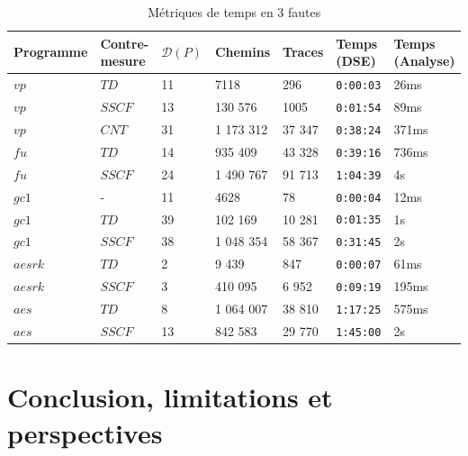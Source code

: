                \begin{table}[htbp]
                \centering
                {\small
                    \setlength\tabcolsep{3pt}
                    \begin{tabular}{ll|lll|ll}
                    Programme & Contre-mesure & $\mathcal{D}(P)$ & Chemins & Traces & Temps (DSE) & Temps (Analyse) \\
                    \hline
                    \hline
                    $vp$ & $TD$ & 11 & 7118 & 296 & \texttt{0:00:03} & 26ms \\
                    $vp$ & $SSCF$ & 13 & 130 576 & 1005 & \texttt{0:01:54} & 89ms \\
                    $vp$ & $CNT$ & 31 & 1 173 312 & 37 347 & \texttt{0:38:24} & 371ms \\
                    \hline
                    $fu$ & $TD$ & 14 & 935 409 & 43 328 & \texttt{0:39:16} & 736ms \\
                    $fu$ & $SSCF$ & 24 & 1 490 767 & 91 713 & \texttt{1:04:39} & 4s \\
                    \hline
                    $gc1$ & - & 11 & 4628 & 78 & \texttt{0:00:04} & 12ms \\
                    $gc1$ & $TD$ & 39 & 102 169 & 10 281 & \texttt{0:01:35} & 1s \\
                    $gc1$ & $SSCF$ & 38 & 1 048 354 & 58 367 & \texttt{0:31:45} & 2s \\
                    \hline
                    $aes rk$ & $TD$ & 2 & 9 439 & 847 & \texttt{0:00:07} & 61ms \\
                    $aes rk$ & $SSCF$ & 3 & 410 095 & 6 952 & \texttt{0:09:19} & 195ms \\
                    \hline
                    $aes$ & $TD$ & 8 & 1 064 007 & 38 810 & \texttt{1:17:25} & 575ms \\
                    $aes$ & $SSCF$ & 13 & 842 583 & 29 770 & \texttt{1:45:00} & 2s
                    \end{tabular}
                }
                \caption{Métriques de temps en 3 fautes \label{tbl:ccpo-metrics}}
                \end{table}
        
    \section{Conclusion, limitations et perspectives}
    \label{sec:ccpo-conclusion}
    
